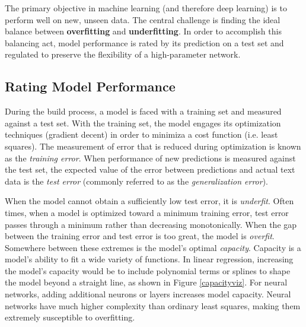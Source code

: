 The primary objective in machine learning (and therefore deep learning) is to perform well on new, unseen data.  The central challenge is finding the ideal balance between \textbf{overfitting} and \textbf{underfitting}.  In order to accomplish this balancing act, model performance is rated by its prediction on a test set and regulated to preserve the flexibility of a high-parameter network.

\subsection{Rating Model Performance}


During the build process, a model is faced with a training set and measured against a test set.  With the training set, the model engages its optimization techniques (gradient decent) in order to minimiza a cost function (i.e. least squares).  The measurement of error that is reduced during optimization is known as the \textit{training error}.  When performance of new predictions is measured against the test set, the expected value of the error between predictions and actual text data is the \textit{test error} (commonly referred to as the \textit{generalization error}). \cite{Goodfellow-et-al-2016}

 When the model cannot obtain a sufficiently low test error, it is \textit{underfit}.  Often times, when a model is optimized toward a minimum training error, test error passes through a minimum rather than decreasing monotonically. \cite{mackay1992bayesian}  When the gap between the training error and test error is too great, the model is \textit{overfit}.  Somewhere between these extremes is the model's optimal \textit{capacity}.  Capacity is a model's ability to fit a wide variety of functions.  In linear regression, increasing the model's capacity would be to include polynomial terms or splines to shape the model beyond a straight line, as shown in Figure \ref{capacityviz}.  For neural networks, adding additional neurons or layers increases model capacity. 
 Neural networks have much higher complexity than ordinary least squares, making them extremely susceptible to overfitting.



